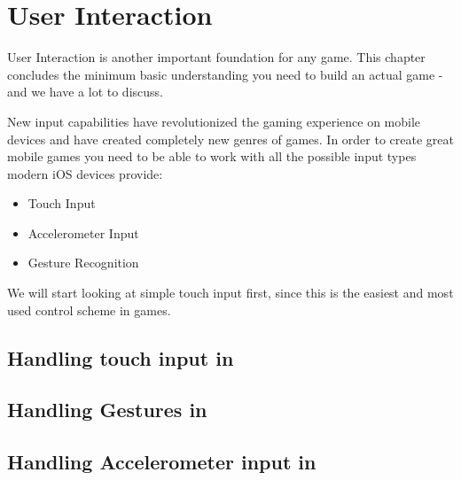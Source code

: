 \chapter{User Interaction}
User Interaction is another important foundation for any game. This chapter
concludes the minimum basic understanding you need to build an actual game - and
we have a lot to discuss.

New input capabilities have revolutionized the gaming experience on mobile
devices and have created completely new genres of games. In order to create
great mobile games you need to be able to work with all the possible input types
modern iOS devices provide:
\begin{itemize}
  \item Touch Input
  \item Accelerometer Input
  \item Gesture Recognition
\end{itemize}
We will start looking at simple touch input first, since this is the easiest and
most used control scheme in games.
\section{Handling touch input in \cocos{}}
\section{Handling Gestures in \cocos{}}
\section{Handling Accelerometer input in \cocos{}}